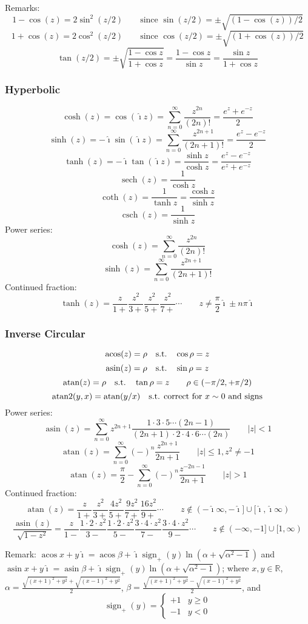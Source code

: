\documentclass[10pt,dvipdfmx,letterpaper,twoside]{article}
\DeclareMathOperator{\acos}{acos}
\DeclareMathOperator{\asin}{asin}
\DeclareMathOperator{\atan}{atan}
\let\O=\operatorname
\newcommand{\RR}{{\mathbb{R}}}
\newcommand{\ii}{{\hat{\imath}}}
\let\al=\alpha
\begin{document}
Remarks:
\[ 1-\cos(z)=2\sin^2(z/2) \qquad\text{since $\sin(z/2)=\pm\sqrt{(1-\cos(z))/2}$} \]
\[ 1+\cos(z)=2\cos^2(z/2) \qquad\text{since $\cos(z/2)=\pm\sqrt{(1+\cos(z))/2}$} \]
\[ \tan(z/2) = \pm\sqrt{\frac{1-\cos z}{1+\cos z}} = \frac{1-\cos z}{\sin z} = \frac{\sin z}{1+\cos z} \]

\subsubsection{Hyperbolic}
\[ \cosh(z) = \cos(\ii z) = \sum_{n=0}^\infty \frac{z^{2n}}{(2n)!} = \frac{e^{z} + e^{-z}}{2} \]
\[ \sinh(z) = -\ii\sin(\ii z) = \sum_{n=0}^\infty \frac{z^{2n+1}}{(2n+1)!} = \frac{e^{z} - e^{-z}}{2} \]
\[ \tanh(z) = -\ii\tan(\ii z) = \frac{\sinh z}{\cosh z} = \frac{e^{z} - e^{-z}}{e^{z} + e^{-z}} \]
\[ \O{sech}(z) = \frac{1}{\cosh z} \]
\[ \O{coth}(z) = \frac{1}{\tanh z} = \frac{\cosh z}{\sinh z} \]
\[ \O{csch}(z) = \frac{1}{\sinh z} \]
Power series:
\[ \cosh(z) = \sum_{n=0}^\infty\frac{z^{2n}}{(2n)!} \]
\[ \sinh(z) = \sum_{n=0}^\infty\frac{z^{2n+1}}{(2n+1)!} \]
Continued fraction:
\[ \tanh(z) = \frac{z}{1+} \frac{z^2}{3+} \frac{z^2}{5+} \frac{z^2}{7+} \cdots \qquad z\neq\frac\pi2\ii\pm n\pi\ii \]

\subsubsection{Inverse Circular}
\[ \acos(z) = \rho \text{\quad s.t.\quad} \cos\rho = z \]
\[ \asin(z) = \rho \text{\quad s.t.\quad} \sin\rho = z \]
\[ \atan(z) = \rho \text{\quad s.t.\quad} \tan\rho = z \qquad \rho\in(-\pi/2, +\pi/2) \]
\[ \O{atan2}(y,x) = \atan(y/x) \text{\quad s.t. correct for $x\sim0$ and signs} \]
Power series:
\[ \asin(z) = \sum_{n=0}^\infty z^{2n+1} \frac{1\cdot3\cdot5\cdots(2n-1)}{(2n+1)\cdot2\cdot4\cdot6\cdots(2n)} \qquad |z|<1 \]
\[ \atan(z) = \sum_{n=0}^\infty(-)^n\frac{z^{2n+1}}{2n+1} \qquad |z|\leq1, z^2\neq-1 \]
\[ \atan(z) = \frac{\pi}{2} - \sum_{n=0}^\infty(-)^n\frac{z^{-2n-1}}{2n+1} \qquad |z|>1 \]
Continued fraction:
\[ \atan(z) = \frac{z}{1+} \frac{z^2}{3+} \frac{4z^2}{5+} \frac{9z^2}{7+} \frac{16z^2}{9+} \cdots
  \qquad z\notin (-\ii\infty,-\ii]\cup[\ii,\ii\infty) \]
\[ \frac{\asin(z)}{\sqrt{1-z^2}} = \frac{z}{1-} \frac{1\cdot2\cdot z^2}{3-} \frac{1\cdot2\cdot z^2}{5-} \frac{3\cdot4\cdot z^2}{7-} \frac{3\cdot4\cdot z^2}{9-} \cdots
  \qquad z\notin (-\infty,-1]\cup[1,\infty) \]

Remark: $\acos x+y\ii = \acos\beta + \ii\O{sign}_+(y)\ln(\al+\sqrt{\al^2-1})$ and
$\asin x+y\ii = \asin\beta + \ii\O{sign}_+(y)\ln(\al+\sqrt{\al^2-1})$;
where $x,y\in\RR$, $\al = \frac{\sqrt{(x+1)^2+y^2} + \sqrt{(x-1)^2+y^2}}{2}$,
$\beta = \frac{\sqrt{(x+1)^2+y^2} - \sqrt{(x-1)^2+y^2}}{2}$,
and \[\O{sign}_+(y) = \begin{cases}+1&y\geq0\\-1&y<0\end{cases}\]
\end{document}
